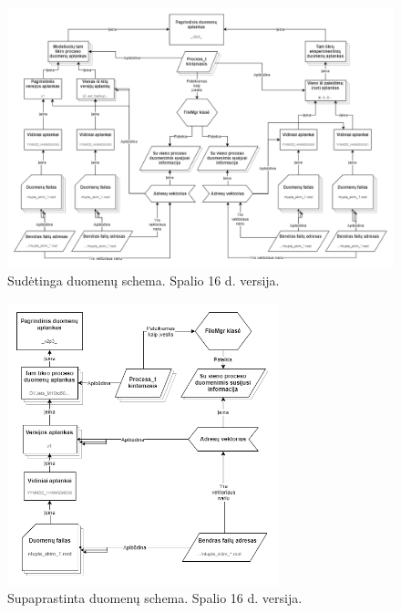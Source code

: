 \documentclass[a4paper, 12pt]{article}
\begin{document}
\begin{itemize}
	\begin{figure}
		\centering
		\label{fig:duomSchemSud}
		\includegraphics[width=\textwidth]{Duomenu_schema_10-16.png}
		\caption{Sudėtinga duomenų schema. Spalio 16 d. versija.}
	\end{figure}
	\begin{figure}
		\centering
		\label{fig:duomSchem}
		\includegraphics[width=0.7\textwidth]{Duomenu_schema_paprasta_10-16.png}
		\caption{Supaprastinta duomenų schema. Spalio 16 d. versija.}
	\end{figure}
\end{itemize}
\end{document}
